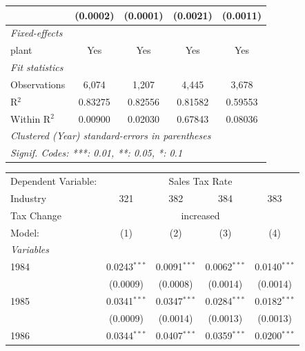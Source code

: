 \documentclass[
  12pt]{article}
\theoremstyle{definition}
\theoremstyle{remark}
\begin{document}
\begin{table}
\begin{minipage}{\linewidth}
\begin{tabular}{lcccc}
                            & (0.0002)                & (0.0001)                & (0.0021)        & (0.0011)\\   
   \midrule
   \emph{Fixed-effects}\\
   plant                    & Yes                     & Yes                     & Yes             & Yes\\  
   \midrule
   \emph{Fit statistics}\\
   Observations             & 6,074                   & 1,207                   & 4,445           & 3,678\\  
   R$^2$                    & 0.83275                 & 0.82556                 & 0.81582         & 0.59553\\  
   Within R$^2$             & 0.00900                 & 0.02030                 & 0.67843         & 0.08036\\  
   \midrule \midrule
   \multicolumn{5}{l}{\emph{Clustered (Year) standard-errors in parentheses}}\\
   \multicolumn{5}{l}{\emph{Signif. Codes: ***: 0.01, **: 0.05, *: 0.1}}\\
\end{tabular}
\par\endgroup
\begingroup
\centering
\begin{tabular}{lcccc}
   \tabularnewline \midrule \midrule
   Dependent Variable: & \multicolumn{4}{c}{Sales Tax Rate}\\
   Industry                 & 321            & 382            & 384            & 383 \\   
   Tax Change & \multicolumn{4}{c}{increased} \\ 
   Model:                   & (1)            & (2)            & (3)            & (4)\\  
   \midrule
   \emph{Variables}\\
   1984                     & 0.0243$^{***}$ & 0.0091$^{***}$ & 0.0062$^{***}$ & 0.0140$^{***}$\\   
                            & (0.0009)       & (0.0008)       & (0.0014)       & (0.0014)\\   
   1985                     & 0.0341$^{***}$ & 0.0347$^{***}$ & 0.0284$^{***}$ & 0.0182$^{***}$\\   
                            & (0.0009)       & (0.0014)       & (0.0013)       & (0.0013)\\   
   1986                     & 0.0344$^{***}$ & 0.0407$^{***}$ & 0.0359$^{***}$ & 0.0200$^{***}$\\   

\end{tabular}
\end{minipage}
\end{table}
\end{document}
